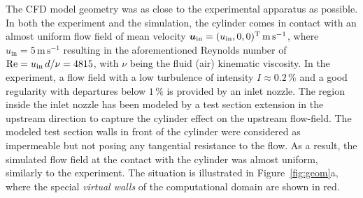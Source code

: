 The CFD model geometry was as close to the experimental apparatus as possible. In both the experiment and the simulation, the cylinder comes in contact with an almost uniform flow field of mean velocity $\bm{u}_{\mathrm{in}} = (u_{\mathrm{in}},0,0)^{\mathrm{T}}\,\mathrm{m\,s^{-1}}$, where $u_{\mathrm{in}} = 5\,\mathrm{m\,s^{-1}}$ resulting in the aforementioned Reynolds number of $\mathrm{Re} = u_{\mathrm{in}}\,d/\nu = 4815$, with $\nu$ being the fluid (air) kinematic viscosity. In the experiment, a flow field with a low turbulence of intensity $I\approx 0.2\,\%$ and a good regularity with departures below $1\,\%$ is provided by an inlet nozzle. The region inside the inlet nozzle has been modeled by a test section extension in the upstream direction to capture the cylinder effect on the upstream flow-field. The modeled test section walls in front of the cylinder were considered as impermeable but not posing any tangential resistance to the flow. As a result, the simulated flow field at the contact with the cylinder was almost uniform, similarly to the experiment. The situation is illustrated in Figure~\ref{fig:geom}a, where the special \textit{virtual walls} of the computational domain are shown in red.

